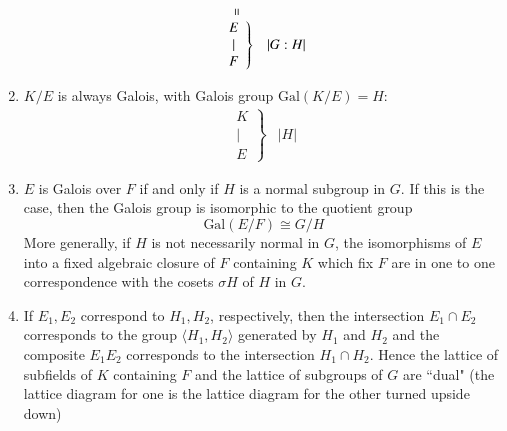 \documentclass[12pt, a4paper, oneside, openright, titlepage]{book}
\begin{document}
\begin{namthm}
\begin{enumerate}
\begin{equation*}
\begin{array}{cc}
                        \shortparallel & \\
                    \left.\begin{array}{c} E \\ \vert \\ F \end{array}\right\} & |G:H| \\
                \end{array}
            \end{equation*}
        \item $K/E$ is always Galois, with Galois group $\text{Gal}(K/E) = H$: \begin{equation*}
            \begin{array}{cc}
                \left.\begin{array}{c} K \\ \vert \\ E \end{array}\right\} & |H|
            \end{array}
            \end{equation*}
        \item $E$ is Galois over $F$ if and only if $H$ is a normal subgroup in $G$. If this is the case, then the Galois group is isomorphic to the quotient group \begin{equation*}
                \text{Gal}(E/F)\cong G/H
        \end{equation*}
            More generally, if $H$ is not necessarily normal in $G$, the isomorphisms of $E$ into a fixed algebraic closure of $F$ containing $K$ which fix $F$ are in one to one correspondence with the cosets $\sigma H$ of $H$ in $G$.
        \item If $E_1,E_2$ correspond to $H_1,H_2$, respectively, then the intersection $E_1\cap E_2$ corresponds to the group $\langle H_1,H_2\rangle$ generated by $H_1$ and $H_2$ and the composite $E_1E_2$ corresponds to the intersection $H_1\cap H_2$. Hence the lattice of subfields of $K$ containing $F$ and the lattice of subgroups of $G$ are ``dual" (the lattice diagram for one is the lattice diagram for the other turned upside down)
    \end{enumerate}
\end{namthm}
\end{document}
